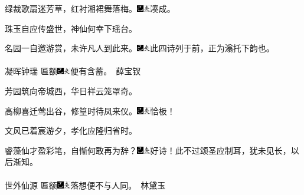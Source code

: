 绿裁歌扇迷芳草，红衬湘裙舞落梅。{\includegraphics[width=3mm]{../Images/00003}\includegraphics[width=3mm]{../Images/00012}\footnotesize \kaishu 凑成。}

珠玉自应传盛世，神仙何幸下瑶台。

名园一自邀游赏，未许凡人到此来。{{\includegraphics[width=3mm]{../Images/00003}\includegraphics[width=3mm]{../Images/00012}\footnotesize \kaishu 此四诗列于前，正为滃托下韵也。}}
\\
\\
\indent
凝晖钟瑞
{\small 匾额{\includegraphics[width=3mm]{../Images/00003}\includegraphics[width=3mm]{../Images/00012}\footnotesize \kaishu 便有含蓄。}}　薛宝钗

芳园筑向帝城西，华日祥云笼罩奇。

高柳喜迁莺出谷，修篁时待凤来仪。{\includegraphics[width=3mm]{../Images/00003}\includegraphics[width=3mm]{../Images/00012}\footnotesize \kaishu 恰极！}

文风已着宸游夕，孝化应隆归省时。

睿藻仙才盈彩笔，自惭何敢再为辞？{\includegraphics[width=3mm]{../Images/00003}\includegraphics[width=3mm]{../Images/00012}\footnotesize \kaishu 好诗！此不过颂圣应制耳，犹未见长，以后渐知。}
\\
\\
\indent
世外仙源
{\small 匾额{\includegraphics[width=3mm]{../Images/00003}\includegraphics[width=3mm]{../Images/00012}\footnotesize \kaishu 落想便不与人同。}}　林黛玉

